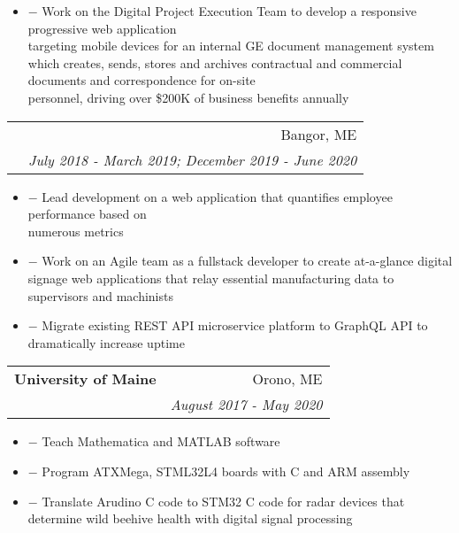 \documentclass[10pt]{article}
\newcommand{\fancyunderline}[1]{%
    \uline{\phantom{#1}}%
    \llap{\contour{white}{#1}}%
}
\newenvironment{details}
{ \begin{itemize}
    \setlength{\itemsep}{0pt}
    \setlength{\parskip}{0pt}
    \setlength{\parsep}{0pt}     
}
{ \end{itemize}}
\begin{document}
    \begin{details}
        \item[$-$] Work on the Digital Project Execution Team to develop a responsive progressive web application \\ targeting mobile devices for an internal GE document management system which creates, sends, stores and archives contractual and commercial documents and correspondence for on-site \\ personnel, driving over \$200K of business benefits annually 
    \end{details}
    \vspace{-10pt}
    \begin{tabular*}{1.015\textwidth}{l@{\extracolsep{\fill}}r}
        \hspace{-5pt} & Bangor, ME \\
        \hspace{-7.5pt} \fancyunderline{GE Power Early Identification Intern} & \textit{\small July 2018 - March 2019; December 2019 - June 2020} \\
    \end{tabular*}\vspace{-2.5pt}
    \begin{details}
        \item[$-$] Lead development on a web application that quantifies employee performance based on\\ numerous metrics
        \item[$-$] Work on an Agile team as a fullstack developer to create at-a-glance digital \\signage web applications that relay essential manufacturing data to supervisors and machinists
        \item[$-$] Migrate existing REST API microservice platform to GraphQL API to dramatically increase uptime
    \end{details}

\vspace{4pt}
    \begin{tabular*}{1.015\textwidth}{l@{\extracolsep{\fill}}r}
        \hspace{-5pt}\textbf{\large University of Maine} & Orono, ME \\
        \hspace{-7.5pt} \fancyunderline{Teaching \& Research Assistant: College of Electrical and Computer Engineering} & \textit{\small August 2017 - May 2020} \\
    \end{tabular*}\vspace{-2.5pt}
    \begin{details}
        \item[$-$] Teach Mathematica and MATLAB software
        \item[$-$] Program ATXMega, STML32L4 boards with C and ARM assembly
        \item[$-$] Translate Arudino C code to STM32 C code for radar devices that determine wild beehive health with digital signal processing
    \end{details}
\end{document}
